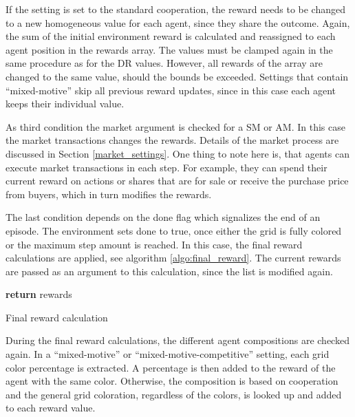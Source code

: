 If the setting is set to the standard cooperation, the reward needs to be changed to a new homogeneous value for each agent, since they share the outcome. Again, the sum of the initial environment reward is calculated and reassigned to each agent position in the rewards array. The values must be clamped again in the same procedure as for the DR values. However, all rewards of the array are changed to the same value, should the bounds be exceeded. Settings that contain ``mixed-motive'' skip all previous reward updates, since in this case each agent keeps their individual value.

As third condition the market argument is checked for a SM or AM. In this case the market transactions changes the rewards. Details of the market process are discussed in Section \ref{market_settings}. One thing to note here is, that agents can execute market transactions in each step. For example, they can spend their current reward on actions or shares that are for sale or receive the purchase price from buyers, which in turn modifies the rewards.

The last condition depends on the done flag which signalizes the end of an episode. The environment sets done to true, once either the grid is fully colored or the maximum step amount is reached. In this case, the final reward calculations are applied, see algorithm \ref{algo:final_reward}. The current rewards are passed as an argument to this calculation, since the list is modified again. %

\begin{algorithm}[H]
    \DontPrintSemicolon
    \;
    \;
    \textbf{return} rewards\;
    \caption{Final reward calculation}\label{algo:final_reward}
\end{algorithm}

During the final reward calculations, the different agent compositions are checked again. In a ``mixed-motive'' or ``mixed-motive-competitive'' setting, each grid color percentage is extracted. A percentage is then added to the reward of the agent with the same color. Otherwise, the composition is based on cooperation and the general grid coloration, regardless of the colors, is looked up and added to each reward value. 

